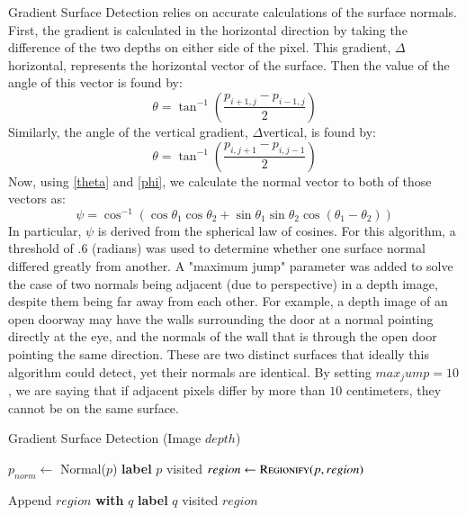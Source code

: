 Gradient Surface Detection relies on accurate calculations of the surface normals. First, the gradient is calculated in the horizontal direction by taking the difference of the two depths on either side of the pixel. This gradient, $\Delta$horizontal, represents the horizontal vector of the surface. Then the value of the angle of this vector is found by: 
\begin{equation}\label{theta}\theta = \tan^{-1}{(\frac{p_{i+1,j}-p_{i-1,j}}{2})} \end{equation}
Similarly, the angle of the vertical gradient, $\Delta$vertical, is found by:
\begin{equation}\label{phi}\theta = \tan^{-1}{(\frac{p_{i,j+1}-p_{i,j-1}}{2})} \end{equation}
Now, using \eqref{theta} and \eqref{phi}, we calculate the normal vector to both of those vectors as:
\begin{equation}\label{psi}\psi = \cos^{-1}{(\cos{\theta_1}\cos{\theta_2} + \sin{\theta_1}\sin{\theta_2}\cos{(\theta_1-\theta_2)})} \end{equation}
In particular, $\psi$ is derived from the spherical law of cosines. For this algorithm, a threshold of .6 (radians) was used to determine whether one surface normal differed greatly from another. A "maximum jump" parameter was added to solve the case of two normals being adjacent (due to perspective) in a depth image, despite them being far away from each other. For example, a depth image of an open doorway may have the walls surrounding the door at a normal pointing directly at the eye, and the normals of the wall that is through the open door pointing the same direction. These are two distinct surfaces that ideally this algorithm could detect, yet their normals are identical. By setting $max_jump =  10$, we are saying that if adjacent pixels differ by more than $10$ centimeters, they cannot be on the same surface.



\begin{algorithm}
\caption{Gradient Surface Detection (Image $depth$)}\label{gradient}
\begin{algorithmic}[1]
\State $p_{norm} \gets$ Normal($p$) 
\EndFor
{}
\State \textbf{label} $p$ visited
\State $region \gets \Call{Regionify}{p, region}$
\EndIf
\EndFor
\item[]
\State Append $region$ \textbf{with} $q$
\State \textbf{label} $q$ visited
\State {}
\EndIf
\EndFor
\State \Return $region$
\EndProcedure
\end{algorithmic}
\end{algorithm}

